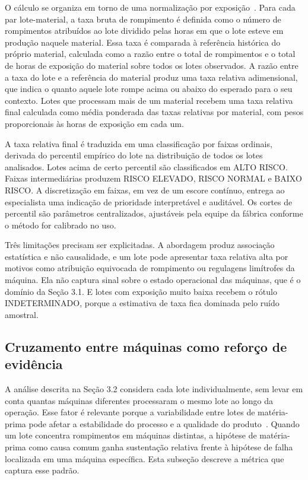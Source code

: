 \documentclass[12pt]{article}
\begin{document}
{O cálculo se organiza em torno de uma normalização por exposição~\cite{finkelstein2008failure, 1372900}. Para cada par lote-material, a taxa bruta de rompimento é definida como o número de rompimentos atribuídos ao lote dividido pelas horas em que o lote esteve em produção naquele material. Essa taxa é comparada à referência histórica do próprio material, calculada como a razão entre o total de rompimentos e o total de horas de exposição do material sobre todos os lotes observados. A razão entre a taxa do lote e a referência do material produz uma taxa relativa adimensional, que indica o quanto aquele lote rompe acima ou abaixo do esperado para o seu contexto. Lotes que processam mais de um material recebem uma taxa relativa final calculada como média ponderada das taxas relativas por material, com pesos proporcionais às horas de exposição em cada um.}
%

{A taxa relativa final é traduzida em uma classificação por faixas ordinais, derivada do percentil empírico do lote na distribuição de todos os lotes analisados. Lotes acima de certo percentil são classificados em \textsc{ALTO RISCO}. Faixas intermediárias produzem \textsc{RISCO ELEVADO}, \textsc{RISCO NORMAL} e \textsc{BAIXO RISCO}. A discretização em faixas, em vez de um escore contínuo, entrega ao especialista uma indicação de prioridade interpretável e auditável. Os cortes de percentil são parâmetros centralizados, ajustáveis pela equipe da fábrica conforme o método for calibrado no uso.}
%

{Três limitações precisam ser explicitadas. A abordagem produz associação estatística e não causalidade, e um lote pode apresentar taxa relativa alta por motivos como atribuição equivocada de rompimento ou regulagens limítrofes da máquina. Ela não captura sinal sobre o estado operacional das máquinas, que é o domínio da Seção 3.1. E lotes com exposição muito baixa recebem o rótulo \textsc{INDETERMINADO}, porque a estimativa de taxa fica dominada pelo ruído amostral.}
%

\subsection{Cruzamento entre máquinas como reforço de evidência}
%
{A análise descrita na Seção 3.2 considera cada lote individualmente, sem levar em conta quantas máquinas diferentes processaram o mesmo lote ao longo da operação. Esse fator é relevante porque a variabilidade entre lotes de matéria-prima pode afetar a estabilidade do processo e a qualidade do produto~\cite{PORTIER2021100077}. Quando um lote concentra rompimentos em máquinas distintas, a hipótese de matéria-prima como causa comum ganha sustentação relativa frente à hipótese de falha localizada em uma máquina específica. Esta subseção descreve a métrica que captura esse padrão.}
%
\end{document}
